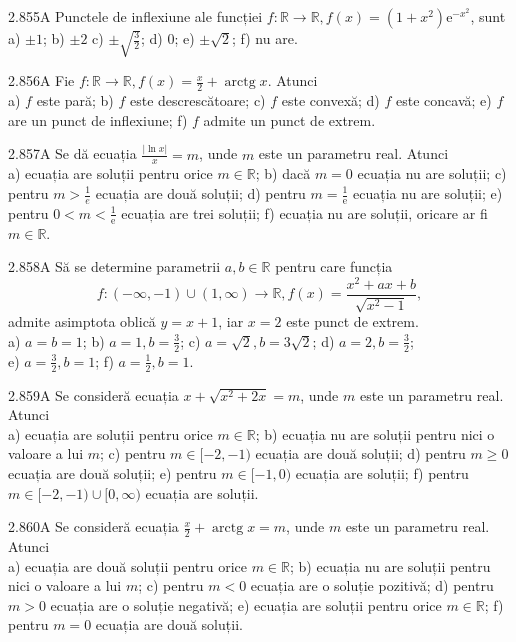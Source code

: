 \documentclass[11pt]{article}
\begin{document}
2.855A Punctele de inflexiune ale funcției $f: \mathbb{R} \rightarrow \mathbb{R}, f(x)=\left(1+x^{2}\right) \mathrm{e}^{-x^{2}}$, sunt\\ a) $\pm 1$; b) $\pm 2$ c) $\pm \sqrt{\frac{3}{2}}$; d) $0$; e) $\pm \sqrt{2}$; f) nu are.

2.856A Fie $f: \mathbb{R} \rightarrow \mathbb{R}, f(x)=\frac{x}{2}+\operatorname{arctg} x$. Atunci\\ a) $f$ este pară; b) $f$ este descrescătoare; c) $f$ este convexă; d) $f$ este concavă; e) $f$ are un punct de inflexiune; f) $f$ admite un punct de extrem.

2.857A Se dă ecuația $\frac{|\ln x|}{x}=m$, unde $m$ este un parametru real. Atunci\\ a) ecuația are soluții pentru orice $m \in \mathbb{R}$; b) dacă $m=0$ ecuația nu are soluții; c) pentru $m>\frac{1}{e}$ ecuația are două soluții; d) pentru $m=\frac{1}{\mathrm{e}}$ ecuația nu are soluții; e) pentru $0<m<\frac{1}{\mathrm{e}}$ ecuația are trei soluții; f) ecuația nu are soluții, oricare ar fi $m \in \mathbb{R}$.

2.858A Să se determine parametrii $a, b \in \mathbb{R}$ pentru care funcția $$f:(-\infty,-1) \cup(1, \infty) \rightarrow \mathbb{R}, f(x)=\frac{x^{2}+a x+b}{\sqrt{x^{2}-1}},$$
admite asimptota oblică $y=x+1$, iar $x=2$ este punct de extrem.\\ a) $a=b=1$; b) $a=1, b=\frac{3}{2}$; c) $a=\sqrt{2}, b=3 \sqrt{2}$; d) $a=2, b=\frac{3}{2}$;\\ e) $a=\frac{3}{2}, b=1$; f) $a=\frac{1}{2}, b=1$.

2.859A Se consideră ecuația $x+\sqrt{x^{2}+2 x}=m$, unde $m$ este un parametru real. Atunci\\ a) ecuația are soluții pentru orice $m \in \mathbb{R}$; b) ecuația nu are soluții pentru nici o valoare a lui $m$; c) pentru $m \in[-2,-1)$ ecuația are două soluții; d) pentru $m \geq 0$ ecuația are două soluții; e) pentru $m \in[-1,0)$ ecuația are soluții; f) pentru $m \in[-2,-1) \cup[0, \infty)$ ecuația are soluții.

2.860A Se consideră ecuația $\frac{x}{2}+\operatorname{arctg} x=m$, unde $m$ este un parametru real. Atunci\\ a) ecuația are două soluții pentru orice $m \in \mathbb{R}$; b) ecuația nu are soluții pentru nici o valoare a lui $m$; c) pentru $m<0$ ecuația are o soluție pozitivă; d) pentru $m>0$ ecuația are o soluție negativă; e) ecuația are soluții pentru orice $m \in \mathbb{R}$; f) pentru $m=0$ ecuația are două soluții.
\end{document}
